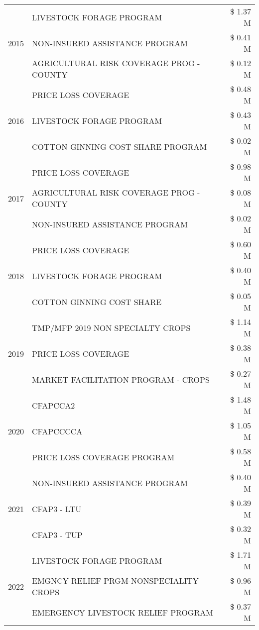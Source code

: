 \begin{tabular}{llr}
\multirow[t]{3}{*}{2015} & LIVESTOCK FORAGE PROGRAM & \$ 1.37 M \\
 & NON-INSURED ASSISTANCE PROGRAM & \$ 0.41 M \\
 & AGRICULTURAL RISK COVERAGE PROG - COUNTY & \$ 0.12 M \\
\cline{1-3}
\multirow[t]{3}{*}{2016} & PRICE LOSS COVERAGE & \$ 0.48 M \\
 & LIVESTOCK FORAGE PROGRAM & \$ 0.43 M \\
 & COTTON GINNING COST SHARE PROGRAM & \$ 0.02 M \\
\cline{1-3}
\multirow[t]{3}{*}{2017} & PRICE LOSS COVERAGE & \$ 0.98 M \\
 & AGRICULTURAL RISK COVERAGE PROG - COUNTY & \$ 0.08 M \\
 & NON-INSURED ASSISTANCE PROGRAM & \$ 0.02 M \\
\cline{1-3}
\multirow[t]{3}{*}{2018} & PRICE LOSS COVERAGE & \$ 0.60 M \\
 & LIVESTOCK FORAGE PROGRAM & \$ 0.40 M \\
 & COTTON GINNING COST SHARE & \$ 0.05 M \\
\cline{1-3}
\multirow[t]{3}{*}{2019} & TMP/MFP 2019 NON SPECIALTY CROPS & \$ 1.14 M \\
 & PRICE LOSS COVERAGE & \$ 0.38 M \\
 & MARKET FACILITATION PROGRAM - CROPS & \$ 0.27 M \\
\cline{1-3}
\multirow[t]{3}{*}{2020} & CFAPCCA2 & \$ 1.48 M \\
 & CFAPCCCCA & \$ 1.05 M \\
 & PRICE LOSS COVERAGE PROGRAM & \$ 0.58 M \\
\cline{1-3}
\multirow[t]{3}{*}{2021} & NON-INSURED ASSISTANCE PROGRAM & \$ 0.40 M \\
 & CFAP3 - LTU & \$ 0.39 M \\
 & CFAP3 - TUP & \$ 0.32 M \\
\cline{1-3}
\multirow[t]{3}{*}{2022} & LIVESTOCK FORAGE PROGRAM & \$ 1.71 M \\
 & EMGNCY RELIEF PRGM-NONSPECIALITY CROPS & \$ 0.96 M \\
 & EMERGENCY LIVESTOCK RELIEF PROGRAM & \$ 0.37 M \\
\cline{1-3}
\bottomrule
\end{tabular}
